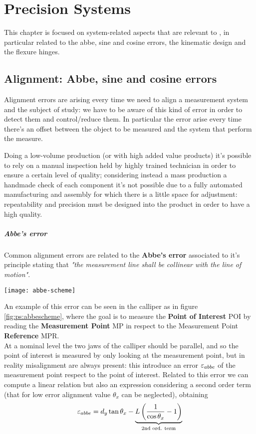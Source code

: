 \chapter{Precision Systems}
	This chapter is focused on system-related aspects that are relevant to , in particular related to the abbe, sine and cosine errors, the kinematic design and the flexure hinges.
	
\section{Alignment: Abbe, sine and cosine errors}
	
	Alignment errors are arising every time we need to align a measurement system and the subject of study: we have to be aware of this kind of error in order to detect them and control/reduce them. In particular the  error arise every time there's an offset between the object to be measured and the system that perform the measure.
	
	Doing a low-volume production (or with high added value products) it's possible to rely on a manual inspection held by highly trained technician in order to ensure a certain level of quality; considering instead a mass production a handmade check of each component it's not possible due to a fully automated manufacturing and assembly for which there is a little space for adjustment: repeatability and precision must be designed into the product in order to have a high quality.
	
	\paragraph{Abbe's error} Common alignment errors are related to the \textbf{Abbe's error} associated  to it's principle stating that \textit{"the measurement line shall be collinear with the line of motion"}.
	
	\begin{SCfigure}[1][bht]
		\centering
		\texttt{[image: abbe-scheme]}
		\caption{scheme used to understand the Abbe's error on a calliper. $(a)$ is a correct calliper while $(b)$ is affected by the error.} \label{fig:ps:abbescheme}
	\end{SCfigure}
	An example of this error can be seen in the calliper as in figure \ref{fig:ps:abbescheme}, where the goal is to measure the \textbf{Point of Interest} POI by reading the \textbf{Measurement Point} MP in respect to the Measurement Point \textbf{Reference} MPR. \\
	At a nominal level the two jaws of the calliper should be parallel, and so the point of interest is measured by only looking at the measurement point, but in reality misalignment are always present: this introduce an error $\varepsilon_{abbe}$ of the measurement point respect to the point of interest. Related to this error we can compute a linear relation but also an expression considering a second order term (that for low error alignment value $\theta_x$ can be neglected), obtaining
	\begin{equation}
		\varepsilon_{abbe} = d_y \tan\theta_x - \underbrace{L \left(\frac 1 {\cos\theta_x} - 1\right)}_\textrm{2nd ord. term}
	\end{equation}
	
